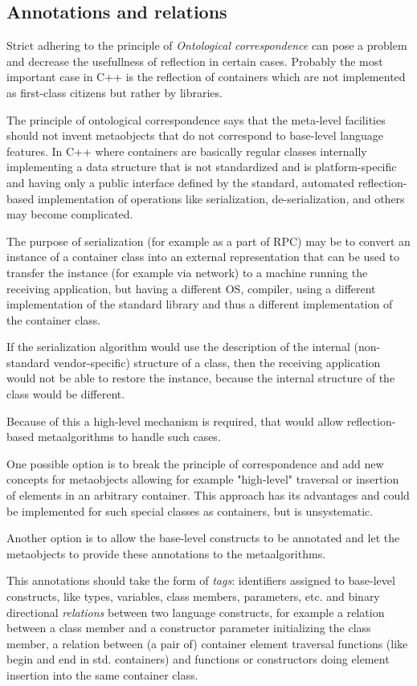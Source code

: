 \subsection{Annotations and relations}

Strict adhering to the principle of {\em Ontological correspondence} can pose
a problem and decrease the usefullness of reflection in certain cases.
Probably the most important case in C++ is the reflection of containers
which are not implemented as first-class citizens but rather by libraries.

The principle of ontological correspondence says that the meta-level facilities
should not invent metaobjects that do not correspond to base-level
language features. In C++ where containers are basically regular
classes internally implementing a data structure that is not standardized
and is platform-specific and having only a public interface defined 
by the standard, automated reflection-based implementation of operations
like serialization, de-serialization, and others may become complicated.

The purpose of serialization (for example as a part of RPC) may be to
convert an instance of a container class into an external representation
that can be used to transfer the instance (for example via network) 
to a machine running the receiving application, but having a different
OS, compiler, using a different implementation of the standard library
and thus a different implementation of the container class.

If the serialization algorithm would use the description of the internal
(non-standard vendor-specific) structure of a class, then the receiving
application would not be able to restore the instance, because the 
internal structure of the class would be different.

Because of this a high-level mechanism is required, that would allow
reflection-based metaalgorithms to handle such cases.

One possible option is to break the principle of correspondence
and add new concepts for metaobjects allowing for example
"high-level" traversal or insertion of elements in an arbitrary
container. This approach has its advantages and could be implemented
for such special classes as containers, but is unsystematic.

Another option is to allow the base-level constructs to be annotated
and let the metaobjects to provide these annotations to the metaalgorithms.

This annotations should take the form of {\em tags}: identifiers assigned
to base-level constructs, like types, variables, class members, parameters,
etc. and binary directional {\em relations} between two language constructs,
for example a relation between a class member and a constructor parameter
initializing the class member, a relation between (a pair of) container
element traversal functions (like begin and end in std. containers) and 
functions or constructors doing element insertion into the same container
class.
